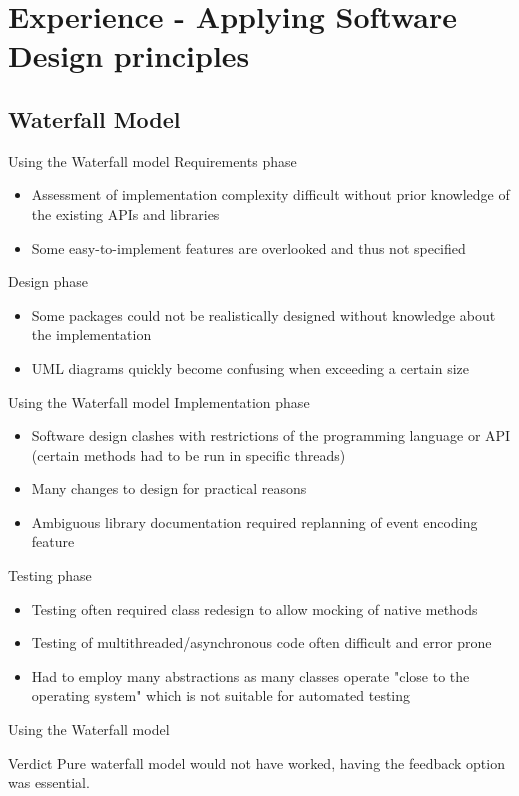  \section{Experience - Applying Software Design principles}
 \subsection{Waterfall Model}
\begin{frame}{Using the Waterfall model}
Requirements phase
\begin{itemize}
\item Assessment of implementation complexity difficult without prior knowledge of the existing APIs and libraries
\item Some easy-to-implement features are overlooked and thus not specified
\end{itemize}
Design phase
\begin{itemize}
\item Some packages could not be realistically designed without knowledge about the implementation
\item UML diagrams quickly become confusing when exceeding a certain size
\end{itemize}

\end{frame}
\begin{frame}{Using the Waterfall model}
Implementation phase
\begin{itemize}
\item Software design clashes with restrictions of the programming language or API (certain methods had to be run in specific threads)
\item Many changes to design for practical reasons
\item Ambiguous library documentation required replanning of event encoding feature
\end{itemize}

Testing phase
\begin{itemize}
\item Testing often required class redesign to allow mocking of native methods
\item Testing of multithreaded/asynchronous code often difficult and error prone
\item Had to employ many abstractions as many classes operate "close to the operating system" which is not suitable for automated testing
\end{itemize}
\end{frame}

\begin{frame}{Using the Waterfall model}
\begin{block}{Verdict}
Pure waterfall model would not have worked, having the feedback option was essential.
\end{block}
\end{frame}